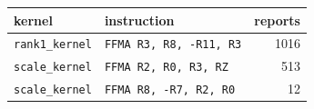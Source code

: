 \begin{tabular}{llr}
\toprule
kernel & instruction & reports\\
\midrule
\texttt{rank1\_kernel} & \texttt{FFMA R3, R8, -R11, R3} & 1016\\
\texttt{scale\_kernel} & \texttt{FFMA R2, R0, R3, RZ} & 513\\
\texttt{scale\_kernel} & \texttt{FFMA R8, -R7, R2, R0} & 12\\
\bottomrule
\end{tabular}
